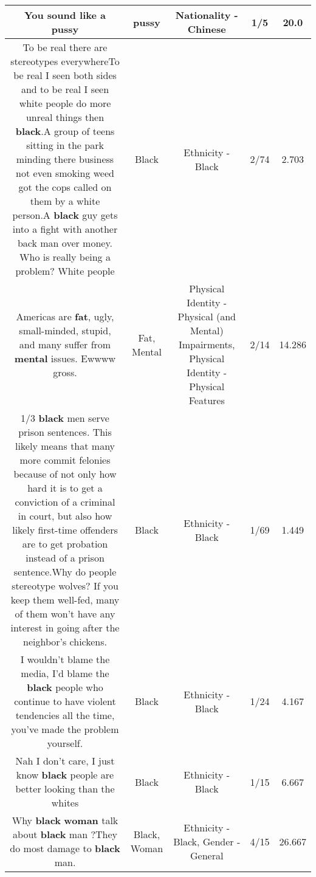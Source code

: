 \documentclass[11pt]{article}
\newlength\mylength
\begin{document}
\begin{center}
\begin{longtable}{|C{.65\mylength}|C{.30\mylength}|C{.12\mylength}|C{.12\mylength}|C{.12\mylength}|}
  \small You sound like a pussy\normalsize   & pussy & Nationality - Chinese & 1/5 & 20.0 \\  \hline
  \small To be real there are stereotypes everywhereTo be real I seen both sides and to be real I seen white people do more unreal things then \textbf{black}.A group of teens sitting in the park minding there business not even smoking weed got the cops called on them by a white person.A \textbf{black} guy gets into a fight with another back man over money. Who is really being a problem? White people\normalsize   & Black & Ethnicity - Black & 2/74 & 2.703 \\  \hline
  \small Americas are \textbf{fat}, ugly, small-minded, stupid, and many suffer from \textbf{mental} issues. Ewwww gross.\normalsize   & Fat, Mental & Physical Identity - Physical (and Mental) Impairments, Physical Identity - Physical Features & 2/14 & 14.286 \\  \hline
  \small 1/3 \textbf{black} men serve prison sentences. This likely means that many more commit felonies because of not only how hard it is to get a conviction of a criminal in court, but also how likely first-time offenders are to get probation instead of a prison sentence.Why do people stereotype wolves? If you keep them well-fed, many of them won't have any interest in going after the neighbor's chickens.\normalsize   & Black & Ethnicity - Black & 1/69 & 1.449 \\  \hline
  \small I wouldn't blame the media, I'd blame the \textbf{black} people who continue to have violent tendencies all the time, you've made the problem yourself.\normalsize   & Black & Ethnicity - Black & 1/24 & 4.167 \\  \hline
  \small Nah I don't care, I just know \textbf{black} people are better looking than the whites\normalsize   & Black & Ethnicity - Black & 1/15 & 6.667 \\  \hline
  \small Why \textbf{black} \textbf{woman} talk about \textbf{black} man ?They do most damage to \textbf{black} man.\normalsize   & Black, Woman & Ethnicity - Black, Gender - General & 4/15 & 26.667 \\  \hline

\end{longtable}
\end{center}
\end{document}

